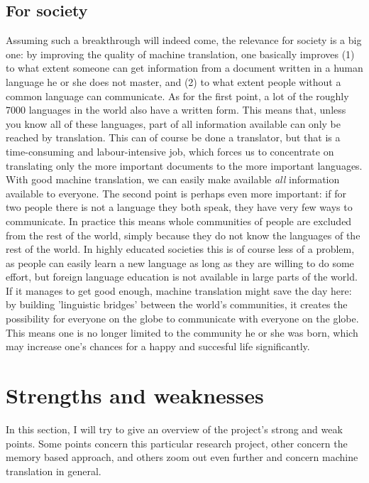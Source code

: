\documentclass[12pt]{article}
\begin{document}
\subsection{For society} \label{soc}

Assuming such a breakthrough will indeed come, the relevance for society is a big one: by improving the quality of machine translation, one basically improves (1) to what extent someone can get information from a document written in a human language he or she does not master, and (2) to what extent people without a common language can communicate. As for the first point, a lot of the roughly 7000 languages in the world also have a written form. This means that, unless you know all of these languages, part of all information available can only be reached by translation. This can of course be done a translator, but that is a time-consuming and labour-intensive job, which forces us to concentrate on translating only the more important documents to the more important languages. With good machine translation, we can easily make available \emph{all} information available to everyone. The second point is perhaps even more important: if for two people there is not a language they both speak, they have very few ways to communicate. In practice this means whole communities of people are excluded from the rest of the world, simply because they do not know the languages of the rest of the world. In highly educated societies this is of course less of a problem, as people can easily learn a new language as long as they are willing to do some effort, but foreign language education is not available in large parts of the world. If it manages to get good enough, machine translation might save the day here: by building 'linguistic bridges' between the world's communities, it creates the possibility for everyone on the globe to communicate with everyone on the globe. This means one is no longer limited to the community he or she was born, which may increase one's chances for a happy and succesful life significantly.






\section{Strengths and weaknesses}

In this section, I will try to give an overview of the project's strong and weak points. Some points concern this particular research project, other concern the memory based approach, and others zoom out even further and concern machine translation in general.
\end{document}
